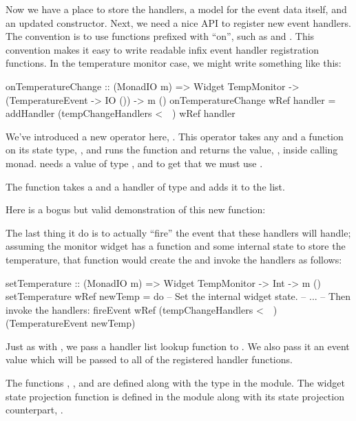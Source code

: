 Now we have a place to store the handlers, a model for the event data
itself, and an updated constructor.  Next, we need a nice API to
register new event handlers.  The  convention is to use
functions prefixed with ``on'', such as  and
.  This convention makes it easy to write readable
infix event handler registration functions.  In the temperature
monitor case, we might write something like this:

\begin{haskellcode}
 onTemperatureChange :: (MonadIO m) => Widget TempMonitor
                     -> (TemperatureEvent -> IO ())
                     -> m ()
 onTemperatureChange wRef handler =
   addHandler (tempChangeHandlers <~~) wRef handler
\end{haskellcode}

We've introduced a new operator here, \fw{<\string~\string~}.  This
operator takes any  and a function on its state type,
, and runs the function and returns the value, ,
inside calling monad.   needs a value of type
, and to get that we must use
\fw{<\string~\string~}.

The  function takes a  and a handler of
type  and adds it to the  list.

Here is a bogus but valid demonstration of this new function:


The last thing it do is to actually ``fire'' the event that these
handlers will handle; assuming the monitor widget has a
 function and some internal state to store the
temperature, that function would create the  and
invoke the handlers as follows:

\begin{haskellcode}
 setTemperature :: (MonadIO m) => Widget TempMonitor -> Int -> m ()
 setTemperature wRef newTemp = do
   -- Set the internal widget state.
   -- ...
   -- Then invoke the handlers:
   fireEvent wRef (tempChangeHandlers <~~) (TemperatureEvent newTemp)
\end{haskellcode}

Just as with , we pass a handler list lookup function
to .  We also pass it an event value which will be
passed to all of the registered handler functions.

The functions , , and 
are defined along with the  type in the 
module.  The widget state projection function \fw{<\string~\string~}
is defined in the  module along with its 
state projection counterpart, \fw{<\string~}.
